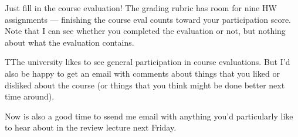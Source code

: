 \documentclass[12pt, leqno]{article} %
\begin{document}

Just fill in the course evaluation!  The grading rubric has room for
nine HW assignments --- finishing the course eval counts toward your
participation score.  Note that I can see whether you completed the
evaluation or not, but nothing about what the evaluation contains.

TThe university likes to see general participation in course
evaluations.  But I'd also be happy to get an email with comments
about things that you liked or disliked about the course (or things
that you think might be done better next time around).

Now is also a good time to ssend me email with anything you'd
particularly like to hear about in the review lecture next Friday.
\end{document}
